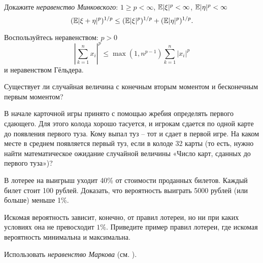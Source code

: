 \begin{problem}
Докажите \textit{неравенство Минковского}: $1 \geq p < \infty$, $\mathrm{{\mathbb E}} |\xi|^p < \infty$, $\mathrm{{\mathbb E}} |\eta|^p < \infty$  
\[
(\mathrm{{\mathbb E}} |\xi + \eta |^p)^{1/p} \leq (\mathrm{{\mathbb E}} |\xi|^p)^{1/p} + (\mathrm{{\mathbb E}} |\eta|^p)^{1/p}. 
\]
\end{problem}

\begin{ordre}
Воспользуйтесь неравенством: $p > 0$ 
\[
\left| \sum \limits_{k=1}^n x_i \right|^p \leq \max(1, n^{p-1}) \sum \limits_{k=1}^n |x_i|^p  
\]
и неравенством Гёльдера.
\end{ordre}

\begin{problem}
Существует ли случайная величина с конечным вторым моментом и бесконечным первым моментом?
\end{problem}

\begin{problem}
В начале карточной игры принято с помощью жребия определять первого сдающего. Для этого колода хорошо тасуется, и игрокам сдается по одной карте до появления первого туза. Кому выпал туз -- тот и сдает в первой игре. На каком месте в среднем появляется первый туз, если в колоде 32 карты (то есть, нужно найти математическое ожидание случайной величины «Число карт, сданных до первого туза»)?
\end{problem}



\begin{problem}

 В лотерее на выигрыш уходит 40\% от стоимости проданных билетов. Каждый билет стоит 100 рублей. Доказать, что вероятность выиграть 5000 рублей (или больше) меньше 1\%.

Искомая вероятность зависит, конечно, от правил лотереи, но ни при каких условиях она не превосходит $1\%$.
Приведите пример правил лотереи, где искомая вероятность минимальна и максимальна.

\begin{ordre} 
Использовать \textit{неравенство Маркова} (см. \cite{book2012}).
\end{ordre}

\end{problem}

